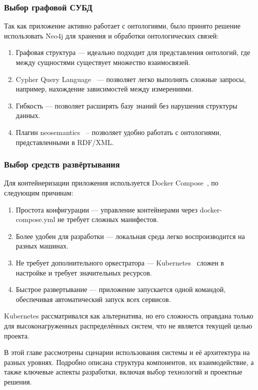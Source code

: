 \subsubsection{Выбор графовой СУБД}

Так как приложение активно работает с онтологиями, было принято решение использовать Neo4j для хранения и обработки онтологических связей:
\begin{enumerate}
    \item Графовая структура — идеально подходит для представления онтологий, где между сущностями существует множество взаимосвязей.
    \item Cypher Query Language~\cite{QueryLang:CypherQL} — позволяет легко выполнять сложные запросы, например, нахождение зависимостей между измерениями.
    \item Гибкость — позволяет расширять базу знаний без нарушения структуры данных.
    \item Плагин neosemantics~\cite{Library:NeoSemantics} – позволяет удобно работать с онтологиями, представленными в RDF/XML.
\end{enumerate}

\subsubsection{Выбор средств развёртывания}

Для контейнеризации приложения используется Docker Compose~\cite{Tool:DockerCompose}, по следующим причинам:
\begin{enumerate}
    \item Простота конфигурации — управление контейнерами через docker-compose.yml не требует сложных манифестов.
    \item Более удобен для разработки — локальная среда легко воспроизводится на разных машинах.
    \item Не требует дополнительного оркестратора — Kubernetes~\cite{Tool:Kubernetes} сложен в настройке и требует значительных ресурсов.
    \item Быстрое развертывание — приложение запускается одной командой, обеспечивая автоматический запуск всех сервисов.
\end{enumerate}

Kubernetes рассматривался как альтернатива, но его сложность оправдана только для высоконагруженных распределённых систем, что не является текущей целью проекта.


В этой главе рассмотрены сценарии использования системы и её архитектура на разных уровнях. Подробно описана структура компонентов, их взаимодействие, а также ключевые аспекты разработки, включая выбор технологий и проектные решения.